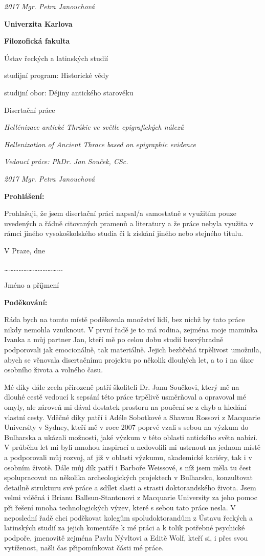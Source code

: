 {\em 2017 Mgr. Petra Janouchová}

{\bf Univerzita Karlova}

{\bf Filozofická fakulta}

Ústav řeckých a latinských studií

studijní program: Historické vědy

studijní obor: Dějiny antického starověku

Disertační práce

{\em Hellénizace antické Thrákie ve světle epigrafických nálezů}

{\em Hellenization of Ancient Thrace based on epigraphic evidence}

{\em Vedoucí práce: PhDr. Jan Souček, CSc.}

{\em 2017 Mgr. Petra Janouchová}

{\bf Prohlášení:}

Prohlašuji, že jsem disertační práci napsal/a samostatně s využitím pouze uvedených a řádně citovaných pramenů a literatury a že práce nebyla využita v rámci jiného vysokoškolského studia či k získání jiného nebo stejného titulu.

V Praze, dne

\ldots{}\ldots{}\ldots{}\ldots{}\ldots{}\ldots{}\ldots{}\ldots{}\ldots{}\ldots{}\ldots{}...

Jméno a příjmení

{\bf Poděkování:}

Ráda bych na tomto místě poděkovala množství lidí, bez nichž by tato práce nikdy nemohla vzniknout. V první řadě je to má rodina, zejména moje maminka Ivanka a můj partner Jan, kteří mě po celou dobu studií bezvýhradně podporovali jak emocionálně, tak materiálně. Jejich bezbřehá trpělivost umožnila, abych se věnovala disertačnímu projektu po několik dlouhých let, a to i na úkor osobního života a volného času.

Mé díky dále zcela přirozeně patří školiteli Dr. Janu Součkovi, který mě na dlouhé cestě vedoucí k sepsání této práce trpělivě usměrňoval a opravoval mé omyly, ale zároveň mi dával dostatek prostoru na poučení se z chyb a hledání vlastní cesty. Vděčné díky patří i Adéle Sobotkové a Shawnu Rossovi z Macquarie University v Sydney, kteří mě v roce 2007 poprvé vzali s sebou na výzkum do Bulharska a ukázali možnosti, jaké výzkum v této oblasti antického světa nabízí. V průběhu let mi byli mnohou inspirací a nedovolili mi ustrnout na jednom místě a podporovali můj rozvoj, ať již v oblasti výzkumu, akademické kariéry, tak i v osobním životě. Dále můj dík patří i Barboře Weissové, s níž jsem měla tu čest spolupracovat na několika archeologických projektech v Bulharsku, konzultovat detailně strukturu své práce a sdílet slasti a strasti doktorandského života. Jsem velmi vděčná i Brianu Ballsun-Stantonovi z Macquarie University za jeho pomoc při řešení mnoha technologických výzev, které s sebou tato práce nesla. V neposlední řadě chci poděkovat kolegům spoludoktorandům z Ústavu řeckých a latinských studií za jejich komentáře k mé práci a k tolik potřebné psychické podpoře, jmenovitě zejména Pavlu Nývltovi a Editě Wolf, kteří si, i přes svou vytíženost, našli čas připomínkovat části mé práce.

